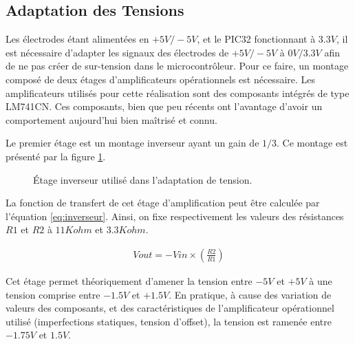 \documentclass[letterpaper, twoside, 12pt, memoire, creativecommons, hyperref]{thETS}
\begin{document}
\subsection{Adaptation des Tensions}

Les électrodes étant alimentées en $+5V/-5V$, et le PIC32 fonctionnant à $3.3V$, il est nécessaire d’adapter les signaux des électrodes de $+5V/-5V$ à $0V/3.3V$ afin de ne pas créer de sur-tension dans le microcontrôleur. Pour ce faire, un montage composé de deux étages d'amplificateurs opérationnels est nécessaire.  Les amplificateurs utilisés pour cette réalisation sont des composants intégrés de type LM741CN. Ces composants, bien que peu récents ont l'avantage d'avoir un comportement aujourd'hui bien maîtrisé et connu. 

Le premier étage est un montage inverseur ayant un gain de $1/3$. Ce montage est présenté par la figure \ref{fig:inverseur}.

\begin{figure}
	\centering
	\caption{Étage inverseur utilisé dans l'adaptation de tension.}
	\label{fig:inverseur}
\end{figure}

La fonction de transfert de cet étage d'amplification peut être calculée par l'équation \ref{eq:inverseur}. Ainsi, on fixe respectivement les valeurs des résistances $R1$ et $R2$ à $11Kohm$ et $3.3Kohm$.

\begin{align}\label{eq:inverseur}
   Vout = -Vin \times ( \frac{R2}{R1} )
\end{align}

Cet étage permet théoriquement d'amener la tension entre $-5V$ et $+5V$ à une tension comprise entre $-1.5V$ et $+1.5V$. En pratique, à cause des variation de valeurs des composants, et des caractéristiques de l'amplificateur opérationnel utilisé (imperfections statiques, tension d'offset), la tension est ramenée entre $-1.75V$ et $1.5V$.
\end{document}
